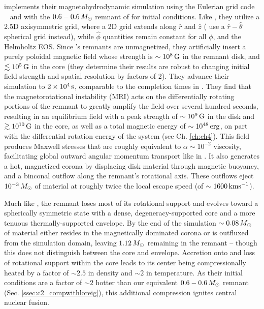 \cite{ji+13} implements their magnetohydrodynamic simulation using the Eulerian grid code \flash\ \citep{fryx+00} and with the $0.6 - 0.6\,\Msun$ remnant of \citeal{loreig09} for initial conditions.  Like \cite{schw+12}, they utilize a 2.5D axisymmetric grid, where a 2D grid extends along $\hat{r}$ and $\hat{z}$ (\cite{schw+12} use a $\hat{r}-\hat{\theta}$ spherical grid instead), while $\hat{\phi}$ quantities remain constant for all $\phi$, and the Helmholtz EOS.  Since \citeal{loreig09}'s remnants are unmagnetized, they artificially insert a purely poloidal magnetic field whose strength is $\sim10^8\,\mathrm{G}$ in the remnant disk, and $\lesssim10^5\,\mathrm{G}$ in the core (they determine their results are robust to changing initial field strength and spatial resolution by factors of 2).  They advance their simulation to $2\times10^4\,\mathrm{s}$, comparable to the completion times in \cite{schw+12}.  They find that the magnetorotational instability (MRI) acts on the differentially rotating portions of the remnant to greatly amplify the field over several hundred seconds, resulting in an equilibrium field with a peak strength of $\sim10^9\,\mathrm{G}$ in the disk and $\gtrsim10^{10}\,\mathrm{G}$ in the core, as well as a total magnetic energy of $\sim10^{48}\,\mathrm{erg}$, on part with the differential rotation energy of the system (see Ch. \ref{ch:ch4}).  This field produces Maxwell stresses that are roughly equivalent to $\alpha \sim 10^{-2}$ viscosity, facilitating global outward angular momentum transport like in \cite{schw+12}.  It also generates a hot, magnetized corona by displacing disk material through magnetic buoyancy, and a binconal outflow along the remnant's rotational axis.  These outflows eject $10^{-3}\,\Msun$ of material at roughly twice the local escape speed (of $\sim1600\,\mrm{km}\psec$).  

Much like \cite{schw+12}, the remnant loses most of its rotational support and evolves toward a spherically symmetric state with a dense, degeneracy-supported core and a more tenuous thermally-supported envelope.  By the end of the simulation $\sim0.08\,\Msun$ of material either resides in the magnetically dominated corona or is outfluxed from the simulation domain, leaving $1.12\,\Msun$ remaining in the remnant -- though this does not distinguish between the core and envelope.  Accretion onto and loss of rotational support within the core leads to its center being compressionally heated by a factor of $\sim2.5$ in density and $\sim2$ in temperature.  As their initial conditions are a factor of $\sim2$ hotter than our equivalent $0.6 - 0.6\,\Msun$ remnant (Sec. \ref{ssec:c2_compwithloreig}), this additional compression ignites central nuclear fusion.

